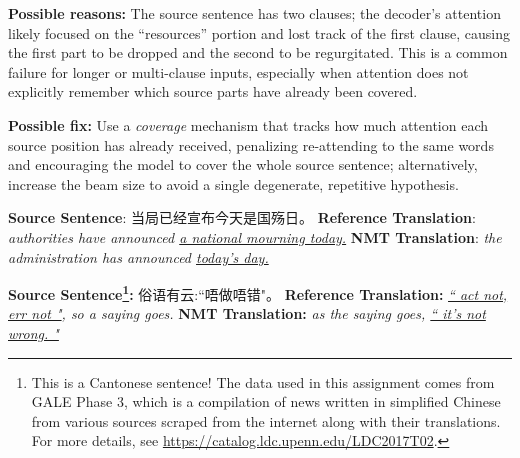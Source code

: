 \begin{parts}
\begin{subparts}
{        \textbf{Possible reasons:} The source sentence has two clauses; the decoder's attention likely focused on the ``resources'' portion and lost track of the first clause, causing the first part to be dropped and the second to be regurgitated. This is a common failure for longer or multi-clause inputs, especially when attention does not explicitly remember which source parts have already been covered.

        \textbf{Possible fix:} Use a \emph{coverage} mechanism that tracks how much attention each source position has already received, penalizing re-attending to the same words and encouraging the model to cover the whole source sentence; alternatively, increase the beam size to avoid a single degenerate, repetitive hypothesis.
        }

        \subpart[2]
        \textbf{Source Sentence}: 当局已经宣布今天是国殇日。 \newline
        \textbf{Reference Translation}: \textit{authorities have announced \underline{a national mourning today.}}\newline
        \textbf{NMT Translation}: \textit{the administration has announced \underline{today's day.}}

        

        \subpart[2] 
        \textbf{Source Sentence\footnote{This is a Cantonese sentence! The data used in this assignment comes from GALE Phase 3, which is a compilation of news written in simplified Chinese from various sources scraped from the internet along with their translations. For more details, see \url{https://catalog.ldc.upenn.edu/LDC2017T02}. }:} 俗语有云:``唔做唔错"。\newline
        \textbf{Reference Translation:} \textit{\underline{`` act not, err not "}, so a saying goes.}\newline
        \textbf{NMT Translation:} \textit{as the saying goes, \underline{`` it's not wrong. "}}


\end{subparts}
\end{parts}
